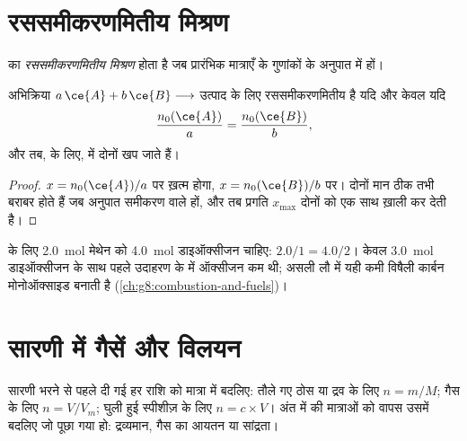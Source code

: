 \section{रससमीकरणमितीय मिश्रण}

\begin{definition}\label{def:g10:reaction-progress-table:stoichiometric}
 का  \emph{रससमीकरणमितीय
मिश्रण} होता है जब प्रारंभिक मात्राएँ  के गुणांकों के अनुपात में हों।
\end{definition}

\begin{proposition}[सभी अभिकारक एक साथ ख़त्म होते हैं]\label{prop:g10:reaction-progress-table:together}
अभिक्रिया $a\,\ce{A} + b\,\ce{B} \longrightarrow$ उत्पाद के लिए 
रससमीकरणमितीय है यदि और केवल यदि
\[
  \frac{n_0(\ce{A})}{a} = \frac{n_0(\ce{B})}{b},
\]
और तब,  के लिए,  में दोनों  खप जाते
हैं।
\end{proposition}

\begin{proof}
 $x = n_0(\ce{A})/a$ पर ख़त्म होगा,  $x = n_0(\ce{B})/b$ पर।
दोनों मान ठीक तभी बराबर होते हैं जब अनुपात समीकरण वाले हों, और तब
प्रगति $x_{\max}$ दोनों को एक साथ ख़ाली कर देती है।
\end{proof}

\begin{example}[मेथेन को साफ़-सुथरे ढंग से जलाना]\label{ex:g10:reaction-progress-table:stoich}
 के लिए \qty{2.0}{mol} मेथेन को
\qty{4.0}{mol} डाइऑक्सीजन चाहिए: $2.0/1 = 4.0/2$। केवल \qty{3.0}{mol}
डाइऑक्सीजन के साथ पहले उदाहरण के  में ऑक्सीजन कम थी; असली लौ में यही कमी
विषैली कार्बन मोनोऑक्साइड बनाती है
(\cref{ch:g8:combustion-and-fuels})।
\end{example}

\section{सारणी में गैसें और विलयन}


\begin{method}[प्रारंभिक अवस्था की मात्राएँ]\label{met:g10:reaction-progress-table:amounts}
सारणी भरने से पहले दी गई हर राशि को मात्रा में बदलिए:
तौले गए ठोस या द्रव के लिए $n = m/M$; गैस के लिए $n = V/V_m$;
घुली हुई स्पीशीज़ के लिए $n = c \times V$। अंत में  की मात्राओं को
वापस उसमें बदलिए जो पूछा गया हो: द्रव्यमान, गैस का आयतन या
सांद्रता।
\end{method}

